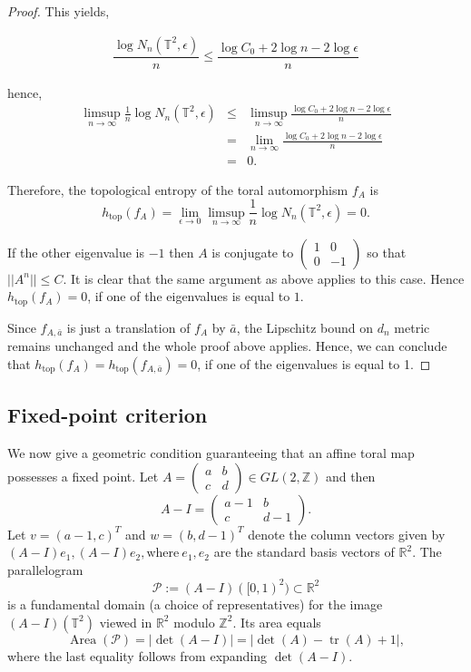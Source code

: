 \documentclass[12pt]{amsart}
\theoremstyle{plain}
\theoremstyle{definition}
\theoremstyle{remark}
\begin{document}
\begin{proof}
This yields, 

\[
\begin{array}{c}
\dfrac{\log N_n(\mathbb{T}^2, \epsilon)}{n}
\leq
\dfrac{\log C_0 + 2\log n - 2\log \epsilon}{n}
\end{array}
\]

hence,  
\[
\begin{array}{rcl}
\displaystyle
\limsup_{n \to \infty} \frac{1}{n}\log N_n(\mathbb{T}^2,\epsilon)
& \le &
\displaystyle
\limsup_{n \to \infty} \frac{\log C_0 + 2\log n - 2\log \epsilon}{n} \\[0.8em]
& = &
\displaystyle
\lim_{n \to \infty} \frac{\log C_0 + 2\log n - 2\log \epsilon}{n} \\[0.8em]
& = & 0 .
\end{array}
\]

Therefore, the topological entropy of the toral automorphism $f_A$ is
\[
h_{\mathrm{top}}(f_A)
=
\lim\limits_{\epsilon \to 0}
\limsup_{n \to \infty}
\frac{1}{n}\log N_n(\mathbb{T}^2,\epsilon)
= 0 .
\]

If the other eigenvalue is $-1$ then $A$ is conjugate to 
$\begin{pmatrix}
1 & 0\\
0 & -1
\end{pmatrix}$ so that $||A^n||\leq C$. It is clear that the same argument as above applies to this case. Hence $h_{\mathrm{top}}(f_{A})=0$, if one of the eigenvalues is equal to $1$. 

Since $f_{A,\bar{a}}$ is just a translation of $f_A$ by $\bar{a}$, the Lipschitz bound on $d_n$ metric remains unchanged and the whole proof above applies. Hence, we can conclude that $h_{\mathrm{top}}(f_A)=h_{\mathrm{top}}(f_{A,\bar{a}})=0$, if one of the eigenvalues is equal to 1.

\end{proof}

\subsection{Fixed-point criterion}

We now give a geometric condition guaranteeing that an affine toral map possesses a fixed point.
Let $ A=\begin{pmatrix}a&b\\ c&d\end{pmatrix}\in GL(2,\mathbb Z)$  and then
$$
A-I=\begin{pmatrix}a-1 & b\\ c & d-1\end{pmatrix}.
$$
Let $ v=(a-1,c)^{T}$  and $ w=(b,d-1)^{T}$  denote the column vectors given by
$ (A-I)e_1,(A-I)e_2, \text{where} ~e_1, e_2$ are the standard basis vectors of $\mathbb{R}^2.$ The parallelogram
$$
\mathcal P := (A-I)([0,1)^2) \subset\mathbb R^2
$$
is a fundamental domain (a choice of representatives) for the image $ (A-I)(\mathbb T^2)$ 
viewed in $ \mathbb R^2$  modulo $ \mathbb Z^2$. Its area equals
$$
\operatorname{Area}(\mathcal P)=\big|\det(A-I)\big| = \big|\det(A)-\operatorname{tr}(A)+1|,
$$
where the last equality follows from expanding $ \det(A-I)$.
\end{document}
